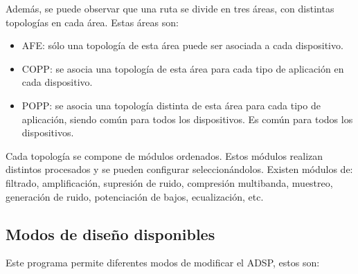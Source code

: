 Además, se puede observar que una ruta se divide en tres áreas, con distintas topologías en cada área. Estas áreas son:
\begin{itemize}
	\item{\gls{AFE}: sólo una topología de esta área puede ser asociada a cada dispositivo.}
	\item{\gls{COPP}: se asocia una topología de esta área para cada tipo de aplicación en cada dispositivo.}
	\item{\gls{POPP}: se asocia una topología distinta de esta área para cada tipo de aplicación, siendo común para todos los dispositivos. Es común para todos los dispositivos.}
\end{itemize}

Cada topología se compone de módulos ordenados. Estos módulos realizan distintos procesados y se pueden configurar seleccionándolos. Existen módulos de: filtrado, amplificación, supresión de ruido, compresión multibanda, muestreo, generación de ruido, potenciación de bajos, ecualización, etc.

\subsection{Modos de diseño disponibles}
Este programa permite diferentes modos de modificar el \gls{ADSP}, estos son: 
 
